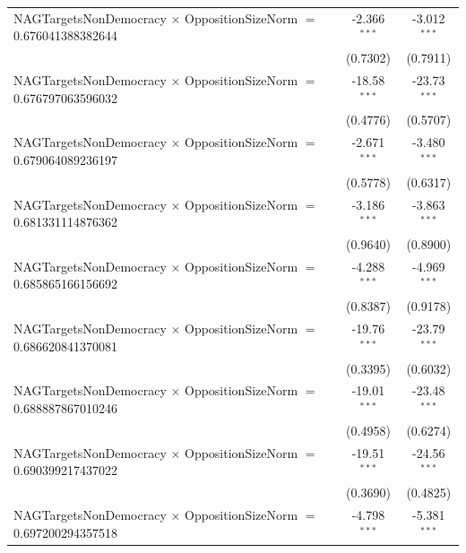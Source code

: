 \begin{tabular}{lcc}
   NAGTargetsNonDemocracy $\times$ OppositionSizeNorm $=$ 0.676041388382644     & -2.366$^{***}$       & -3.012$^{***}$\\   
                                                                                & (0.7302)             & (0.7911)\\   
   NAGTargetsNonDemocracy $\times$ OppositionSizeNorm $=$ 0.676797063596032     & -18.58$^{***}$       & -23.73$^{***}$\\   
                                                                                & (0.4776)             & (0.5707)\\   
   NAGTargetsNonDemocracy $\times$ OppositionSizeNorm $=$ 0.679064089236197     & -2.671$^{***}$       & -3.480$^{***}$\\   
                                                                                & (0.5778)             & (0.6317)\\   
   NAGTargetsNonDemocracy $\times$ OppositionSizeNorm $=$ 0.681331114876362     & -3.186$^{***}$       & -3.863$^{***}$\\   
                                                                                & (0.9640)             & (0.8900)\\   
   NAGTargetsNonDemocracy $\times$ OppositionSizeNorm $=$ 0.685865166156692     & -4.288$^{***}$       & -4.969$^{***}$\\   
                                                                                & (0.8387)             & (0.9178)\\   
   NAGTargetsNonDemocracy $\times$ OppositionSizeNorm $=$ 0.686620841370081     & -19.76$^{***}$       & -23.79$^{***}$\\   
                                                                                & (0.3395)             & (0.6032)\\   
   NAGTargetsNonDemocracy $\times$ OppositionSizeNorm $=$ 0.688887867010246     & -19.01$^{***}$       & -23.48$^{***}$\\   
                                                                                & (0.4958)             & (0.6274)\\   
   NAGTargetsNonDemocracy $\times$ OppositionSizeNorm $=$ 0.690399217437022     & -19.51$^{***}$       & -24.56$^{***}$\\   
                                                                                & (0.3690)             & (0.4825)\\   
   NAGTargetsNonDemocracy $\times$ OppositionSizeNorm $=$ 0.697200294357518     & -4.798$^{***}$       & -5.381$^{***}$\\   

\end{tabular}
